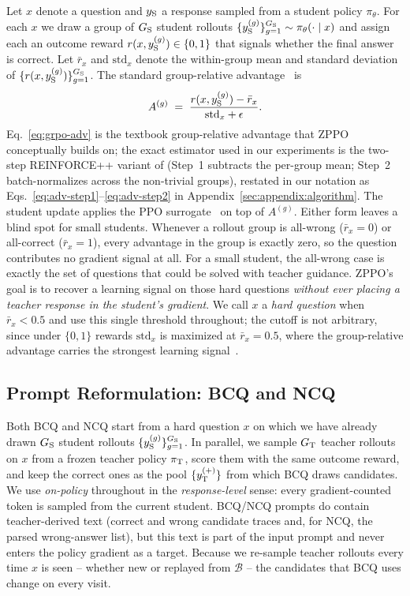 Let $x$ denote a question and $y_{\rm S}$ a response sampled from a student policy $\pi_\theta$. For each $x$ we draw a group of $G_{\rm S}$ student rollouts $\{y_{\rm S}^{(g)}\}_{g=1}^{G_{\rm S}} \sim \pi_\theta(\cdot \mid x)$ and assign each an outcome reward $r(x, y_{\rm S}^{(g)}) \in \{0, 1\}$ that signals whether the final answer is correct. Let $\bar{r}_x$ and $\mathrm{std}_x$ denote the within-group mean and standard deviation of $\{r(x, y_{\rm S}^{(g)})\}_{g=1}^{G_{\rm S}}$. The standard group-relative advantage~\citep{shao2024deepseekmath,yu2025dapo} is
\begin{equation}
A^{(g)} \;=\; \frac{r(x, y_{\rm S}^{(g)}) - \bar{r}_x}{\mathrm{std}_x + \epsilon}.
\label{eq:grpo-adv}
\end{equation}
Eq.~\eqref{eq:grpo-adv} is the textbook group-relative advantage that ZPPO conceptually builds on; the exact estimator used in our experiments is the two-step REINFORCE++ variant of \citet{hu2025reinforce++} (Step~1 subtracts the per-group mean; Step~2 batch-normalizes across the non-trivial groups), restated in our notation as Eqs.~\eqref{eq:adv-step1}--\eqref{eq:adv-step2} in Appendix~\ref{sec:appendix:algorithm}. The student update applies the PPO surrogate~\citep{schulman2017proximal} on top of $A^{(g)}$. Either form leaves a blind spot for small students. Whenever a rollout group is all-wrong ($\bar{r}_x\!=\!0$) or all-correct ($\bar{r}_x\!=\!1$), every advantage in the group is exactly zero, so the question contributes no gradient signal at all. For a small student, the all-wrong case is exactly the set of questions that could be solved with teacher guidance. ZPPO's goal is to recover a learning signal on those hard questions \emph{without ever placing a teacher response in the student's gradient}. We call $x$ a \emph{hard question} when $\bar{r}_x<0.5$ and use this single threshold throughout; the cutoff is not arbitrary, since under $\{0,1\}$ rewards $\mathrm{std}_x$ is maximized at $\bar{r}_x\!=\!0.5$, where the group-relative advantage carries the strongest learning signal~\citep{liu2025understanding}.

\subsection{Prompt Reformulation: BCQ and NCQ}
\label{sec:method:bcqncq}

Both BCQ and NCQ start from a hard question $x$ on which we have already drawn $G_{\rm S}$ student rollouts $\{y_{\rm S}^{(g)}\}_{g=1}^{G_{\rm S}}$. In parallel, we sample $G_{\rm T}$ teacher rollouts on $x$ from a frozen teacher policy $\pi_{\rm T}$, score them with the same outcome reward, and keep the correct ones as the pool $\{y_{\rm T}^{(+)}\}$ from which BCQ draws candidates. We use \emph{on-policy} throughout in the \emph{response-level} sense: every gradient-counted token is sampled from the current student. BCQ/NCQ prompts do contain teacher-derived text (correct and wrong candidate traces and, for NCQ, the parsed wrong-answer list), but this text is part of the input prompt and never enters the policy gradient as a target. Because we re-sample teacher rollouts every time $x$ is seen -- whether new or replayed from $\mathcal{B}$ -- the candidates that BCQ uses change on every visit.

